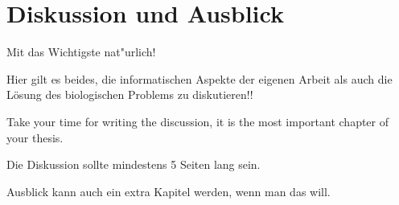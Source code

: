 
\chapter{Diskussion und Ausblick}
  \label{Diskussion}

Mit das Wichtigste nat"urlich!

Hier gilt es beides, die informatischen Aspekte der eigenen Arbeit als auch die L\"osung des biologischen Problems zu diskutieren!!

Take your time for writing the discussion, it is the most important chapter of your thesis.

Die Diskussion sollte mindestens 5 Seiten lang sein.

Ausblick kann auch ein extra Kapitel werden, wenn man das will.
